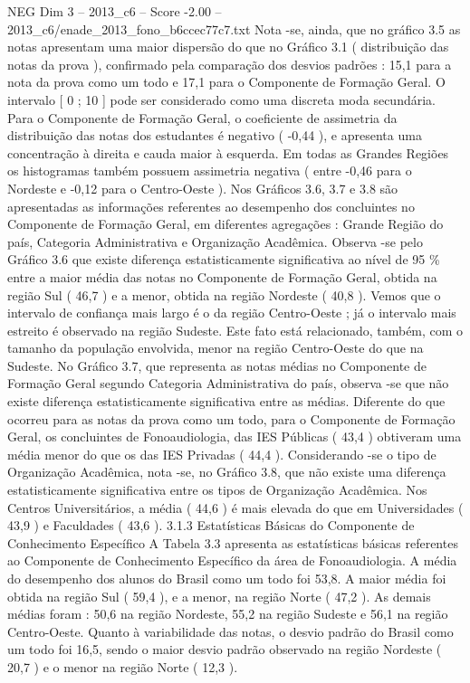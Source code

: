 \begin{textsample}{NEG Dim 3 – 2013\_c6 – Score -2.00 – 2013\_c6/enade\_2013\_fono\_b6ccec77c7.txt}
Nota -se, ainda, que no gráfico 3.5 as notas apresentam uma maior dispersão do que no Gráfico 3.1 ( distribuição das notas da prova ), confirmado pela comparação dos desvios padrões : 15,1 para a nota da prova como um todo e 17,1 para o Componente de Formação Geral.
O intervalo [ 0 ; 10 ] pode ser considerado como uma discreta moda secundária.
Para o Componente de Formação Geral, o coeficiente de assimetria da distribuição das notas dos estudantes é negativo ( -0,44 ), e apresenta uma concentração à direita e cauda maior à esquerda.
Em todas as Grandes Regiões os histogramas também possuem assimetria negativa ( entre -0,46 para o Nordeste e -0,12 para o Centro-Oeste ).
Nos Gráficos 3.6, 3.7 e 3.8 são apresentadas as informações referentes ao desempenho dos concluintes no Componente de Formação Geral, em diferentes agregações : Grande Região do país, Categoria Administrativa e Organização Acadêmica.
Observa -se pelo Gráfico 3.6 que existe diferença estatisticamente significativa ao nível de 95 \% entre a maior média das notas no Componente de Formação Geral, obtida na região Sul ( 46,7 ) e a menor, obtida na região Nordeste ( 40,8 ).
Vemos que o intervalo de confiança mais largo é o da região Centro-Oeste ; já o intervalo mais estreito é observado na região Sudeste.
Este fato está relacionado, também, com o tamanho da população envolvida, menor na região Centro-Oeste do que na Sudeste.
No Gráfico 3.7, que representa as notas médias no Componente de Formação Geral segundo Categoria Administrativa do país, observa -se que não existe diferença estatisticamente significativa entre as médias.
Diferente do que ocorreu para as notas da prova como um todo, para o Componente de Formação Geral, os concluintes de Fonoaudiologia, das IES Públicas ( 43,4 ) obtiveram uma média menor do que os das IES Privadas ( 44,4 ).
Considerando -se o tipo de Organização Acadêmica, nota -se, no Gráfico 3.8, que não existe uma diferença estatisticamente significativa entre os tipos de Organização Acadêmica.
Nos Centros Universitários, a média ( 44,6 ) é mais elevada do que em Universidades ( 43,9 ) e Faculdades ( 43,6 ). 3.1.3 Estatísticas Básicas do Componente de Conhecimento Específico A Tabela 3.3 apresenta as estatísticas básicas referentes ao Componente de Conhecimento Específico da área de Fonoaudiologia.
A média do desempenho dos alunos do Brasil como um todo foi 53,8.
A maior média foi obtida na região Sul ( 59,4 ), e a menor, na região Norte ( 47,2 ).
As demais médias foram : 50,6 na região Nordeste, 55,2 na região Sudeste e 56,1 na região Centro-Oeste.
Quanto à variabilidade das notas, o desvio padrão do Brasil como um todo foi 16,5, sendo o maior desvio padrão observado na região Nordeste ( 20,7 ) e o menor na região Norte ( 12,3 ).

\end{textsample}
